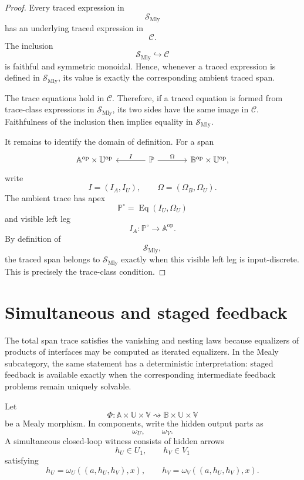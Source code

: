 \begin{proof}
Every traced expression in
\[
\mathcal S_{\mathrm{Mly}}
\]
has an underlying traced expression in
\[
\mathcal C.
\]
The inclusion
\[
\mathcal S_{\mathrm{Mly}}\hookrightarrow\mathcal C
\]
is faithful and symmetric monoidal.  Hence, whenever a traced expression is
defined in \(\mathcal S_{\mathrm{Mly}}\), its value is exactly the corresponding
ambient traced span.

The trace equations hold in \(\mathcal C\).  Therefore, if a traced equation is
formed from trace-class expressions in \(\mathcal S_{\mathrm{Mly}}\), its two
sides have the same image in \(\mathcal C\).  Faithfulness of the inclusion
then implies equality in \(\mathcal S_{\mathrm{Mly}}\).

It remains to identify the domain of definition.  For a span
\[
\begin{tikzcd}[column sep=large]
\mathbb A^{\mathrm{op}}\times\mathbb U^{\mathrm{op}}
&
\mathbb P
  \arrow[l, "I"']
  \arrow[r, "\Omega"]
&
\mathbb B^{\mathrm{op}}\times\mathbb U^{\mathrm{op}},
\end{tikzcd}
\]
write
\[
I=(I_A,I_U),
\qquad
\Omega=(\Omega_B,\Omega_U).
\]
The ambient trace has apex
\[
\mathbb P^\circ=\operatorname{Eq}(I_U,\Omega_U)
\]
and visible left leg
\[
I_A:\mathbb P^\circ\to\mathbb A^{\mathrm{op}}.
\]
By definition of
\[
\mathcal S_{\mathrm{Mly}},
\]
the traced span belongs to \(\mathcal S_{\mathrm{Mly}}\) exactly when this
visible left leg is input-discrete.  This is precisely the trace-class
condition.
\end{proof}

\section{Simultaneous and staged feedback}
\label{sec:simultaneous-staged-feedback}

The total span trace satisfies the vanishing and nesting laws because
equalizers of products of interfaces may be computed as iterated equalizers.
In the Mealy subcategory, the same statement has a deterministic
interpretation: staged feedback is available exactly when the corresponding
intermediate feedback problems remain uniquely solvable.

Let
\[
\Phi:
\mathbb A\times\mathbb U\times\mathbb V
\rightsquigarrow
\mathbb B\times\mathbb U\times\mathbb V
\]
be a Mealy morphism.  In components, write the hidden output parts as
\[
\omega_U,
\qquad
\omega_V.
\]
A simultaneous closed-loop witness consists of hidden arrows
\[
h_U\in U_1,
\qquad
h_V\in V_1
\]
satisfying
\[
h_U=\omega_U((a,h_U,h_V),x),
\qquad
h_V=\omega_V((a,h_U,h_V),x).
\]

